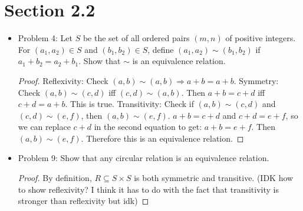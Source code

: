 \documentclass[hidelinks,12pt]{article}
\begin{document}
\section{Section 2.2}
\begin{itemize}
    \item Problem 4: Let $S$ be the set of all ordered pairs $(m,n)$ of positive integers. For $(a_1,a_2)\in S$ and $(b_1,b_2)\in S$, define $(a_1,a_2)\sim(b_1,b_2)$ if $a_1+b_2=a_2+b_1.$ Show that $\sim$ is an equivalence relation.\begin{proof}
    Reflexivity: Check $(a,b)\sim (a,b)\Longrightarrow a+b=a+b$.
    \newline Symmetry: Check $(a,b)\sim (c,d)$ iff $(c,d)\sim(a,b)$. Then $a+b=c+d$ iff $c+d=a+b$. This is true.
    \newline Transitivity: Check if $(a,b)\sim (c,d)$ and $(c,d)\sim(e,f)$, then $(a,b)\sim(e,f)$.
    \newline $a+b=c+d$ and $c+d=e+f$, so we can replace $c+d$ in the second equation to get: $a+b=e+f$. Then $(a,b)\sim(e,f)$. Therefore this is an equivalence relation.
    \end{proof}
    \item Problem 9: Show that any circular relation is an equivalence relation. \begin{proof}
    By definition, $R\subseteq S\times S$ is both symmetric and transitive. (IDK how to show reflexivity? I think it has to do with the fact that transitivity is stronger than reflexivity but idk)
    \end{proof}
\end{itemize}
\end{document}
